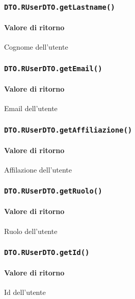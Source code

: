 \subsubsection{\texttt{DTO.RUserDTO.getLastname()}}
\paragraph{Valore di ritorno}
\begin{description}
\item Cognome dell'utente
\end{description}
\subsubsection{\texttt{DTO.RUserDTO.getEmail()}}
\paragraph{Valore di ritorno}
\begin{description}
\item Email dell'utente
\end{description}
\subsubsection{\texttt{DTO.RUserDTO.getAffiliazione()}}
\paragraph{Valore di ritorno}
\begin{description}
\item Affilazione dell'utente
\end{description}
\subsubsection{\texttt{DTO.RUserDTO.getRuolo()}}
\paragraph{Valore di ritorno}
\begin{description}
\item Ruolo dell'utente
\end{description}
\subsubsection{\texttt{DTO.RUserDTO.getId()}}
\paragraph{Valore di ritorno}
\begin{description}
\item Id dell'utente
\end{description}

